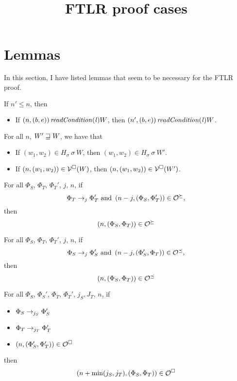 \documentclass[a4paper]{article}
\title{FTLR proof cases}
\begin{document}
\maketitle
\section{Lemmas}
In this section, I have listed lemmas that seem to be necessary for the FTLR proof.
\begin{lemma}
  \label{lem:non-expansive}
  If $n' \leq n$, then
  \begin{itemize}
  \item If $\npair{(b,e)}\readCond{\lin}{W}$, then $\npair[n']{(b,e)}\readCond{\lin}{W}$.
  \end{itemize}
\end{lemma}

\begin{lemma}
  \label{lem:monotonicity}
  For all $n$, $W' \future W$, we have that
  \begin{itemize}
  \item If $(w_1,w_2) \in H_\sigma~\sigma~W$, then $(w_1,w_2) \in H_\sigma~\sigma~W'$.
  \item If $\npair{(w_1,w_2)} \in \lrv(W)$, then $\npair{(w_1,w_2)} \in
    \lrv(W')$.
\end{itemize}
\end{lemma}

\begin{lemma}
  For all $\Phi_S$, $\Phi_T$, $\Phi_T'$, $j$, $n$, if
\[
  \Phi_T \nstep[j] \Phi_T' \text{ and } \npair[n-j]{(\Phi_S,\Phi_T')} \in \lror,
\]
then
\[
  \npair{(\Phi_S,\Phi_T)} \in \lror
\]
\end{lemma}

\begin{lemma}
  For all $\Phi_S$, $\Phi_T$, $\Phi_T'$, $j$, $n$, if
\[
  \Phi_S \nstep[j] \Phi_S' \text{ and } \npair[n-j]{(\Phi_S',\Phi_T)} \in \lrol,
\]
then
\[
  \npair{(\Phi_S,\Phi_T)} \in \lrol
\]
\end{lemma}


\begin{lemma}
  For all $\Phi_S$, $\Phi_S'$, $\Phi_T$, $\Phi_T'$, $j_S,J_T$, $n$, if
  \begin{itemize}
  \item $\Phi_S \nstep[j_S] \Phi_S'$
  \item $\Phi_T \nstep[j_T] \Phi_T'$
  \item $\npair{(\Phi_S',\Phi_T')} \in \lro$
\end{itemize}
then
\[
  \npair[n+\min(j_S,j_T)]{(\Phi_S,\Phi_T)} \in \lro
\]
\end{lemma}
\end{document}
